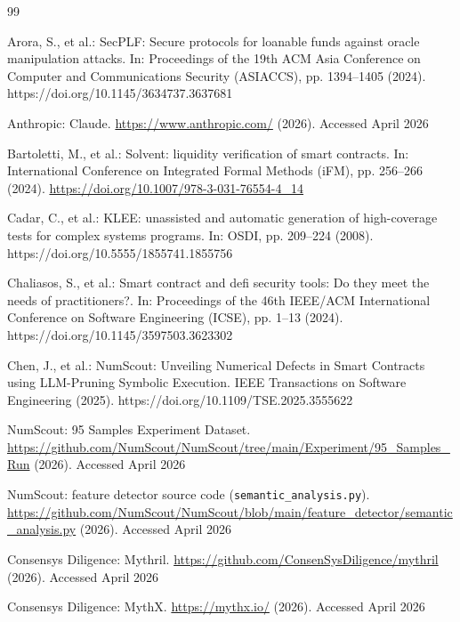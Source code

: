 \documentclass[pdflatex,sn-basic]{sn-jnl}%
\theoremstyle{thmstyleone}%
\theoremstyle{thmstyletwo}%
\theoremstyle{thmstylethree}%
\begin{document}
\begin{thebibliography}{99}

Arora, S., et al.: SecPLF: Secure protocols for loanable funds against oracle manipulation attacks. In: Proceedings of the 19th ACM Asia Conference on Computer and Communications Security (ASIACCS), pp. 1394--1405 (2024). https://doi.org/10.1145/3634737.3637681

Anthropic: Claude. \url{https://www.anthropic.com/} (2026). Accessed April 2026

Bartoletti, M., et al.: Solvent: liquidity verification of smart contracts. In: International Conference on Integrated Formal Methods (iFM), pp. 256--266 (2024). \url{https://doi.org/10.1007/978-3-031-76554-4_14}

Cadar, C., et al.: KLEE: unassisted and automatic generation of high-coverage tests for complex systems programs. In: OSDI, pp. 209--224 (2008). https://doi.org/10.5555/1855741.1855756

Chaliasos, S., et al.: Smart contract and defi security tools: Do they meet the needs of practitioners?. In: Proceedings of the 46th IEEE/ACM International Conference on Software Engineering (ICSE), pp. 1--13 (2024). https://doi.org/10.1145/3597503.3623302

Chen, J., et al.: NumScout: Unveiling Numerical Defects in Smart Contracts using LLM-Pruning Symbolic Execution. IEEE Transactions on Software Engineering (2025). https://doi.org/10.1109/TSE.2025.3555622

NumScout: 95 Samples Experiment Dataset. \url{https://github.com/NumScout/NumScout/tree/main/Experiment/95_Samples_Run} (2026). Accessed April 2026

NumScout: feature detector source code (\texttt{semantic\_analysis.py}). \url{https://github.com/NumScout/NumScout/blob/main/feature_detector/semantic_analysis.py} (2026). Accessed April 2026

Consensys Diligence: Mythril. \url{https://github.com/ConsenSysDiligence/mythril} (2026). Accessed April 2026

Consensys Diligence: MythX. \url{https://mythx.io/} (2026). Accessed April 2026


\end{thebibliography}
\end{document}

